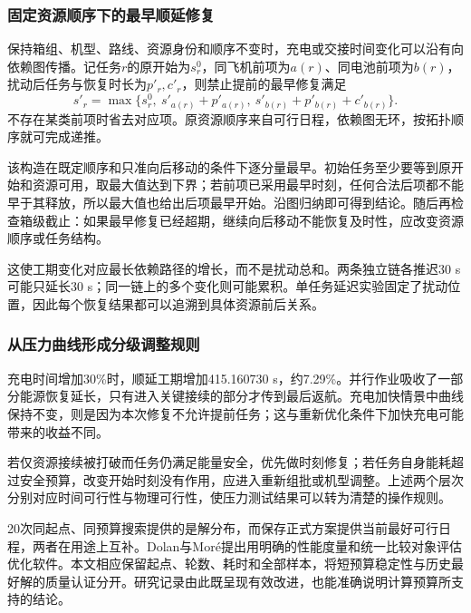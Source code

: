 \subsubsection{固定资源顺序下的最早顺延修复}
保持箱组、机型、路线、资源身份和顺序不变时，充电或交接时间变化可以沿有向依赖图传播。记任务$r$的原开始为$s_r^0$，同飞机前项为$a(r)$、同电池前项为$b(r)$，扰动后任务与恢复时长为$p'_r,c'_r$，则禁止提前的最早修复满足
\begin{equation}
 s'_r=\max\{s_r^0,\ s'_{a(r)}+p'_{a(r)},\ s'_{b(r)}+p'_{b(r)}+c'_{b(r)}\}.
 \label{eq:q2_maxplus_repair}
\end{equation}
不存在某类前项时省去对应项。原资源顺序来自可行日程，依赖图无环，按拓扑顺序就可完成递推。

该构造在既定顺序和只准向后移动的条件下逐分量最早。初始任务至少要等到原开始和资源可用，取最大值达到下界；若前项已采用最早时刻，任何合法后项都不能早于其释放，所以最大值也给出后项最早开始。沿图归纳即可得到结论。随后再检查箱级截止：如果最早修复已经超期，继续向后移动不能恢复及时性，应改变资源顺序或任务结构。

这使工期变化对应最长依赖路径的增长，而不是扰动总和。两条独立链各推迟30 s可能只延长30 s；同一链上的多个变化则可能累积。单任务延迟实验固定了扰动位置，因此每个恢复结果都可以追溯到具体资源前后关系。

\subsubsection{从压力曲线形成分级调整规则}
充电时间增加30\%时，顺延工期增加415.160730 s，约7.29\%。并行作业吸收了一部分能源恢复延长，只有进入关键接续的部分才传到最后返航。充电加快情景中曲线保持不变，则是因为本次修复不允许提前任务；这与重新优化条件下加快充电可能带来的收益不同。

若仅资源接续被打破而任务仍满足能量安全，优先做时刻修复；若任务自身能耗超过安全预算，改变开始时刻没有作用，应进入重新组批或机型调整。上述两个层次分别对应时间可行性与物理可行性，使压力测试结果可以转为清楚的操作规则。

20次同起点、同预算搜索提供的是解分布，而保存正式方案提供当前最好可行日程，两者在用途上互补。Dolan与Moré提出用明确的性能度量和统一比较对象评估优化软件\cite{dolan2002}。本文相应保留起点、轮数、耗时和全部样本，将短预算稳定性与历史最好解的质量认证分开。研究记录由此既呈现有效改进，也能准确说明计算预算所支持的结论。
